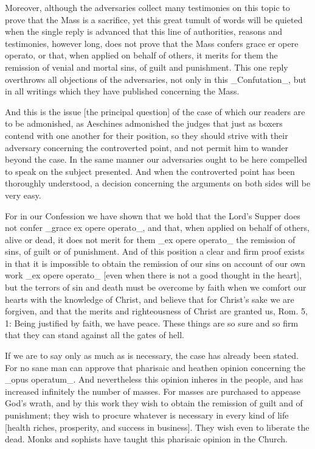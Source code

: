 Moreover, although the adversaries collect many testimonies on this
topic to prove that the Mass is a sacrifice, yet this great tumult of
words will be quieted when the single reply is advanced that this
line of authorities, reasons and testimonies, however long, does not
prove that the Mass confers grace er opere operato, or that, when
applied on behalf of others, it merits for them the remission of
venial and mortal sins, of guilt and punishment.  This one reply
overthrows all objections of the adversaries, not only in this
_Confutation_, but in all writings which they have published
concerning the Mass.

And this is the issue [the principal question] of the case of which
our readers are to be admonished, as Aeschines admonished the judges
that just as boxers contend with one another for their position, so
they should strive with their adversary concerning the controverted
point, and not permit him to wander beyond the case.  In the same
manner our adversaries ought to be here compelled to speak on the
subject presented.  And when the controverted point has been
thoroughly understood, a decision concerning the arguments on both
sides will be very easy.

For in our Confession we have shown that we hold that the Lord's
Supper does not confer _grace ex opere operato_, and that, when
applied on behalf of others, alive or dead, it does not merit for
them _ex opere operato_ the remission of sins, of guilt or of
punishment.  And of this position a clear and firm proof exists in
that it is impossible to obtain the remission of our sins on account
of our own work _ex opere operato_ [even when there is not a good
thought in the heart], but the terrors of sin and death must be
overcome by faith when we comfort our hearts with the knowledge of
Christ, and believe that for Christ's sake we are forgiven, and that
the merits and righteousness of Christ are granted us, Rom. 5, 1:
Being justified by faith, we have peace.  These things are so sure
and so firm that they can stand against all the gates of hell.

If we are to say only as much as is necessary, the case has already
been stated.  For no sane man can approve that pharisaic and heathen
opinion concerning the _opus operatum_.  And nevertheless this
opinion inheres in the people, and has increased infinitely the
number of masses.  For masses are purchased to appease God's wrath,
and by this work they wish to obtain the remission of guilt and of
punishment; they wish to procure whatever is necessary in every kind
of life [health riches, prosperity, and success in business].  They
wish even to liberate the dead.  Monks and sophists have taught this
pharisaic opinion in the Church.


